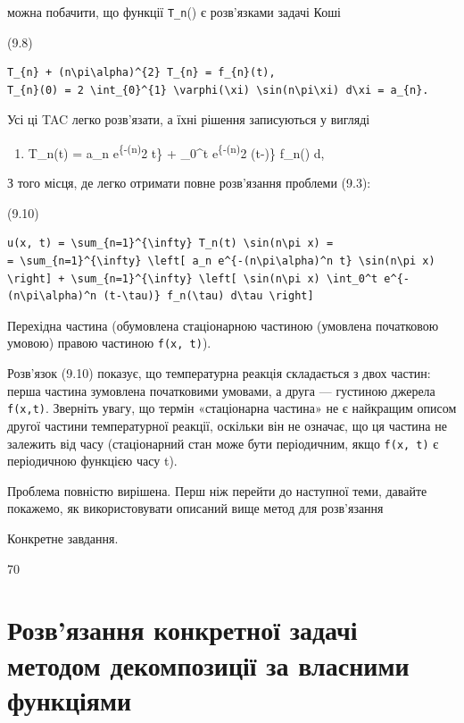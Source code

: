 \documentclass[
  ukrainian,
]{article}
\providecommand{\tightlist}{%
  \setlength{\itemsep}{0pt}\setlength{\parskip}{0pt}}
\begin{document}
можна побачити, що функції \texttt{T\_n}(\ell) є розв'язками задачі Коші

(9.8)

\begin{verbatim}
T_{n} + (n\pi\alpha)^{2} T_{n} = f_{n}(t),
T_{n}(0) = 2 \int_{0}^{1} \varphi(\xi) \sin(n\pi\xi) d\xi = a_{n}.
\end{verbatim}

Усі ці TAC легко розв'язати, а їхні рішення записуються у вигляді

\begin{enumerate}
\def\labelenumi{(\arabic{enumi})}
\setcounter{enumi}{98}
\tightlist
\item
  T\_n(t) = a\_n e\textsuperscript{\{-(n\pi\alpha)}2 t\} + \int\_0\^{}t
  e\textsuperscript{\{-(n\pi\alpha)}2 (t-\tau)\} f\_n(\tau) d\tau,
\end{enumerate}

З того місця, де легко отримати повне розв'язання проблеми (9.3):

(9.10)

\begin{verbatim}
u(x, t) = \sum_{n=1}^{\infty} T_n(t) \sin(n\pi x) =
= \sum_{n=1}^{\infty} \left[ a_n e^{-(n\pi\alpha)^n t} \sin(n\pi x) \right] + \sum_{n=1}^{\infty} \left[ \sin(n\pi x) \int_0^t e^{-(n\pi\alpha)^n (t-\tau)} f_n(\tau) d\tau \right]
\end{verbatim}

Перехідна частина (обумовлена стаціонарною частиною (умовлена початковою
умовою) правою частиною \texttt{f(x,\ t)}).

Розв'язок (9.10) показує, що температурна реакція складається з двох
частин: перша частина зумовлена початковими умовами, а друга ---
густиною джерела \texttt{f(x,t)}. Зверніть увагу, що термін «стаціонарна
частина» не є найкращим описом другої частини температурної реакції,
оскільки він не означає, що ця частина не залежить від часу
(стаціонарний стан може бути періодичним, якщо \texttt{f(x,\ t)} є
періодичною функцією часу t).

Проблема повністю вирішена. Перш ніж перейти до наступної теми, давайте
покажемо, як використовувати описаний вище метод для розв'язання

Конкретне завдання.

70

\section{Розв'язання конкретної задачі методом декомпозиції за власними
функціями}\label{ux440ux43eux437ux432ux44fux437ux430ux43dux43dux44f-ux43aux43eux43dux43aux440ux435ux442ux43dux43eux457-ux437ux430ux434ux430ux447ux456-ux43cux435ux442ux43eux434ux43eux43c-ux434ux435ux43aux43eux43cux43fux43eux437ux438ux446ux456ux457-ux437ux430-ux432ux43bux430ux441ux43dux438ux43cux438-ux444ux443ux43dux43aux446ux456ux44fux43cux438}
\end{document}
